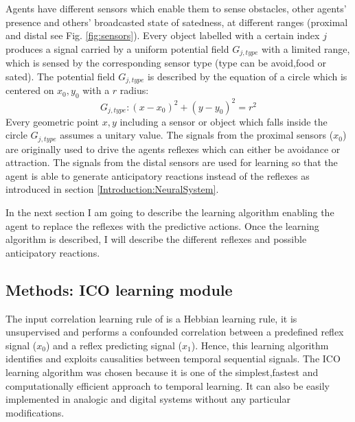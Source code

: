 Agents have different sensors which enable them to sense
obstacles, other agents' presence and others' broadcasted state of satedness, at
different ranges (proximal and distal see Fig. \ref{fig:sensors}).
Every object labelled with a certain index $j$ produces a signal carried by a
uniform potential field $G_{j,type}$ with a limited range, which is sensed
by the corresponding sensor type (type can be avoid,food or sated).
The potential field $G_{j,type}$ is described by the equation of a circle which is centered
on $x_0,y_0$ with a $r$ radius:
\begin{equation}
G_{j,type}:(x-x_0)^2+(y-y_0)^2=r^2 \label{eq:circle}
\end{equation}
Every geometric point $x,y$ including a sensor or object which falls inside 
the circle $G_{j,type}$ assumes a unitary value.
The signals from the proximal sensors ($x_{0}$) are originally used to drive
the agents reflexes which can either be avoidance or attraction. The signals
from the distal sensors are used for learning so that the agent is able to
generate anticipatory reactions instead of the reflexes as introduced in section \ref{Introduction:NeuralSystem}.

In the next section I am going to describe the learning algorithm enabling the agent to
replace the reflexes with the predictive actions.
Once the learning algorithm is described, I will describe the different reflexes and possible
anticipatory reactions.
\subsection{Methods: ICO learning module \label{Section:ICOlearning}}

The input correlation learning rule of \citet{Porr2006ICO} is a Hebbian learning rule,
it is unsupervised and performs a confounded correlation between a predefined reflex signal
($x_{0}$) and a reflex predicting signal ($x_{1}$). Hence, this learning
algorithm identifies and exploits causalities between temporal
sequential signals.
The ICO learning algorithm was chosen because it is one of the simplest,fastest and computationally 
efficient approach to temporal learning.
It can also be easily implemented in analogic and digital systems without any
 particular modifications.

